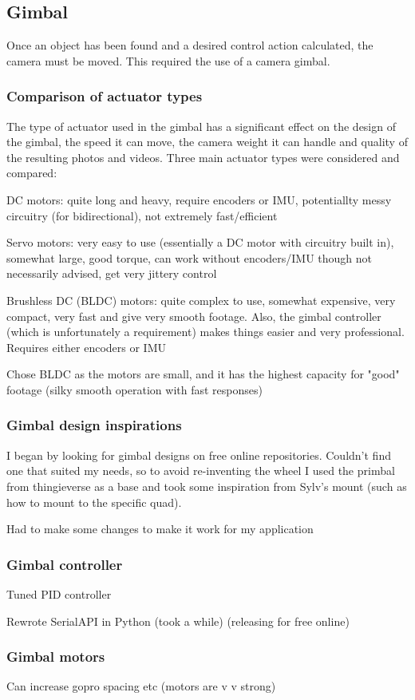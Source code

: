 \subsection{Gimbal}
Once an object has been found and a desired control action calculated, the camera must be moved. This required the use of a camera gimbal.

\subsubsection{Comparison of actuator types}
The type of actuator used in the gimbal has a significant effect on the design of the gimbal, the speed it can move, the camera weight it can handle and quality of the resulting photos and videos. Three main actuator types were considered and compared:

DC motors: quite long and heavy, require encoders or IMU, potentiallty messy circuitry (for bidirectional), not extremely fast/efficient

Servo motors: very easy to use (essentially a DC motor with circuitry built in), somewhat large, good torque, can work without encoders/IMU though not necessarily advised, get very jittery control

Brushless DC (BLDC) motors: quite complex to use, somewhat expensive, very compact, very fast and give very smooth footage. Also, the gimbal controller (which is unfortunately a requirement) makes things easier and very professional. Requires either encoders or IMU

Chose BLDC as the motors are small, and it has the highest capacity for "good" footage (silky smooth operation with fast responses)

\subsubsection{Gimbal design inspirations}
I began by looking for gimbal designs on free online repositories. Couldn't find one that suited my needs, so to avoid re-inventing the wheel I used the primbal from thingieverse as a base and took some inspiration from Sylv's mount (such as how to mount to the specific quad).

Had to make some changes to make it work for my application

\subsubsection{Gimbal controller}
Tuned PID controller

Rewrote SerialAPI in Python (took a while) (releasing for free online)

\subsubsection{Gimbal motors}
Can increase gopro spacing etc (motors are v v strong)